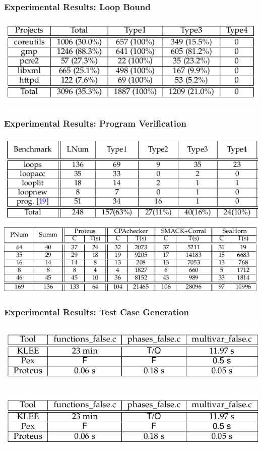\documentclass[11pt]{beamer}
\begin{document}
\fi
\begin{frame}\frametitle{Experimental Results: Loop Bound}
\begin{center}
\includegraphics[scale=0.4]{loopbound.png}
\end{center}
\end{frame}

\begin{frame}\frametitle{Experimental Results: Program Verification}
\begin{center}
\includegraphics[scale=0.35]{loopverif.png}
\includegraphics[scale=0.35]{loopverif1.png}
\end{center}
\end{frame}
\begin{frame}\frametitle{Experimental Results: Test Case Generation}
\begin{center}
\includegraphics[scale=0.35]{testcase.png}

\includegraphics[scale=0.35]{testcase.png}
\end{center}
\end{frame}
\end{document}
